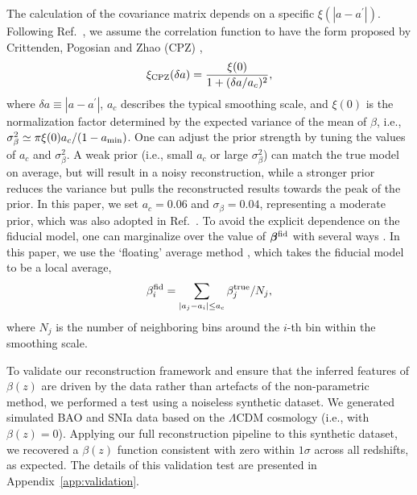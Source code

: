 \documentclass[a4paper,11pt]{article}
\begin{document}
The calculation of the covariance matrix depends on a specific $\xi(|a-a^\prime|)$. Following Ref.~\cite{Crittenden:2011aa}, we assume the correlation function to have the form proposed by Crittenden, Pogosian and Zhao (CPZ) \cite{Crittenden:2005wj}, 
\begin{equation}\label{eq:CPZ}
\xi_{\rm CPZ}(\delta a) =  \frac{\xi (0)} {1 + (\delta a/a_c)^2},
\end{equation}
where $\delta a\equiv|a-a^\prime|$, $a_c$ describes the typical smoothing scale, and $\xi(0)$ is the normalization factor determined by the expected variance of the mean of $\beta$, i.e., $\sigma^2_{\beta} \simeq \pi\xi(0){a_c}/(1-a_{\rm min})$. One can adjust the prior strength by tuning the values of $a_c$ and $\sigma^2_{\beta}$. A weak prior (i.e., small $a_c$ or large $\sigma^2_{\beta}$) can match the true model on average, but will result in a noisy reconstruction, while a stronger prior reduces the variance but pulls the reconstructed results towards the peak of the prior. In this paper, we set $a_c=0.06$ and $\sigma_{\beta}=0.04$, representing a moderate prior, which was also adopted in Ref.~\cite{Wang:2015wga}. To avoid the explicit dependence on the fiducial model, one can marginalize over the value of $\bm{\beta}^{\rm fid}$ with several ways \cite{Crittenden:2011aa}. In this paper, we use the `floating' average method \cite{Crittenden:2011aa}, which takes the fiducial model to be a local average,
\begin{equation}
\beta^{\rm fid}_i = \sum_{|a_j - a_i| \leq a_c} \beta^{\rm true}_j / N_j,
\end{equation}
where $N_j$ is the number of neighboring bins around the $i$-th bin within the smoothing scale. 

{To validate our reconstruction framework and ensure that the inferred features of $\beta(z)$ are driven by the data rather than artefacts of the non-parametric method, we performed a test using a noiseless synthetic dataset. We generated simulated BAO and SNIa data based on the $\Lambda$CDM cosmology (i.e., with $\beta(z)=0$). Applying our full reconstruction pipeline to this synthetic dataset, we recovered a $\beta(z)$ function consistent with zero within $1\sigma$ across all redshifts, as expected. The details of this validation test are presented in Appendix~\ref{app:validation}.}
\end{document}
